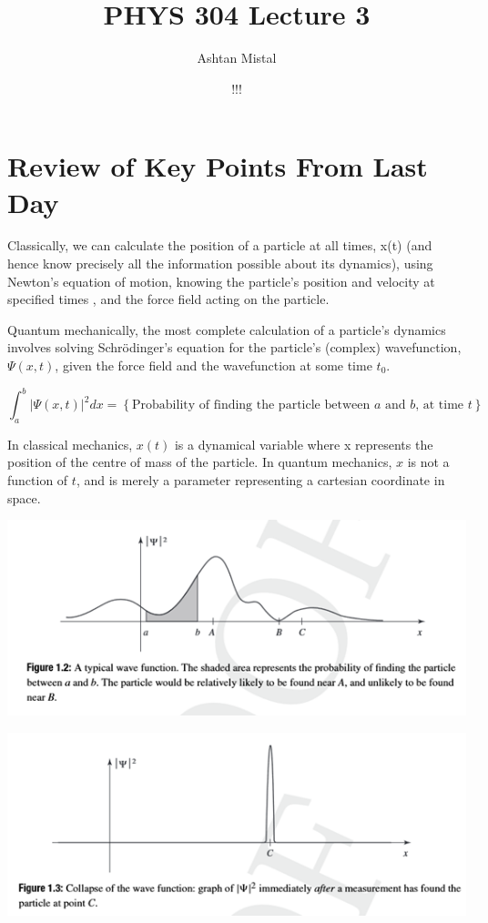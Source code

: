\documentclass{article}
\title{PHYS 304 Lecture 3}
\author{Ashtan Mistal}
\date{!!!}
\begin{document}
\ifstandalone
\maketitle
\fi

\graphicspath{{./Lecture03/}}

\section{Review of Key Points From Last Day}

Classically, we can calculate the position of a particle at all times, x(t) (and hence know precisely all the information possible about its dynamics), using Newton’s equation of motion, knowing the particle’s position and velocity at specified times , and the force field acting on the particle.

Quantum mechanically, the most complete calculation of a particle’s dynamics involves solving Schrödinger's equation for the particle’s (complex) wavefunction,$ \Psi(x,t)$, given the force field and the wavefunction at some time $t_0$. 


$$\int_a^b |\Psi(x,t)|^2 dx = \left\{ \text{Probability of finding the particle between } a \text{ and } b \text{, at time } t \right\}$$

In classical mechanics, $x(t)$ is a dynamical variable where x represents the position of the centre of mass of the particle.  In quantum mechanics, $x$ is not a function of $t$, and is merely a parameter representing a cartesian coordinate in space.


\includegraphics[width = 0.7 \textwidth]{Lecture02/2.png}

\includegraphics[width = 0.7 \textwidth]{Lecture02/3.png}
\end{document}
